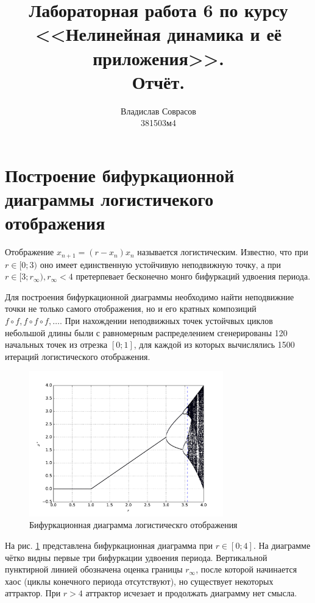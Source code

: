 \documentclass[a4paper]{article}
\begin{document}
\title{Лабораторная работа 6 по курсу <<Нелинейная динамика и её приложения>>. \\Отчёт.}
\author{Владислав Соврасов\\ 381503м4}
\date{}
\maketitle

\section{Построение бифуркационной диаграммы логистичекого отображения}

Отображение \(x_{n+1}=(r-x_n)x_n\) называется логистическим. Известно, что при \(r\in [0;3)\)
оно имеет единственную устойчивую неподвижную точку, а при \(r\in [3;r_\infty),r_\infty<4\)
претерпевает бесконечно монго бифуркаций удвоения периода.

Для построения бифуркационной диаграммы необходимо найти неподвижние точки не только самого отображения,
но и его кратных композиций \(f\circ f, f\circ f \circ f, \dots\).
При нахождении неподвижных точек устойчвых циклов небольшой длины были с равномерным распределением сгенерированы
120 начальных точек из отрезка \([0;1]\), для каждой из которых вычислялись 1500 итераций логистического отображения.

\begin{figure}[H]
	\center
	\includegraphics[width=0.75\textwidth]{../pictures/lab6_bifurcation_diagram.pdf}
	\caption{Бифуркационная диаграмма логистическго отображения}
	\label{fig:bifurcation_diagram}
\end{figure}

На рис. \ref{fig:bifurcation_diagram} представлена бифуркационная диаграмма при \(r\in[0;4]\).
На диаграмме чётко видны первые три бифуркации удвоения периода.
Вертикальной пунктирной линией обозначена оценка границы \(r_\infty\), после которой начинается
хаос (циклы конечного периода отсутствуют), но существует некоторых аттрактор.
При \(r>4\) аттрактор исчезает и продолжать диаграмму нет смысла.
\end{document}
